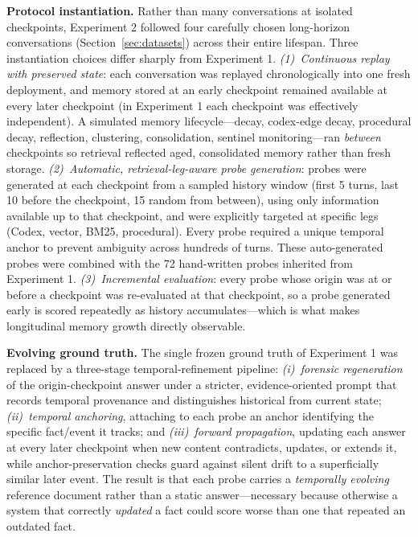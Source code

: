 \documentclass[10pt]{article}
\begin{document}
\textbf{Protocol instantiation.} Rather than many conversations at isolated checkpoints, Experiment 2 followed four carefully chosen long-horizon conversations (Section~\ref{sec:datasets}) across their entire lifespan. Three instantiation choices differ sharply from Experiment 1. \emph{(1)~Continuous replay with preserved state}: each conversation was replayed chronologically into one fresh deployment, and memory stored at an early checkpoint remained available at every later checkpoint (in Experiment 1 each checkpoint was effectively independent). A simulated memory lifecycle---decay, codex-edge decay, procedural decay, reflection, clustering, consolidation, sentinel monitoring---ran \emph{between} checkpoints so retrieval reflected aged, consolidated memory rather than fresh storage. \emph{(2)~Automatic, retrieval-leg-aware probe generation}: probes were generated at each checkpoint from a sampled history window (first 5 turns, last 10 before the checkpoint, 15 random from between), using only information available up to that checkpoint, and were explicitly targeted at specific legs (Codex, vector, BM25, procedural). Every probe required a unique temporal anchor to prevent ambiguity across hundreds of turns. These auto-generated probes were combined with the 72 hand-written probes inherited from Experiment 1. \emph{(3)~Incremental evaluation}: every probe whose origin was at or before a checkpoint was re-evaluated at that checkpoint, so a probe generated early is scored repeatedly as history accumulates---which is what makes longitudinal memory growth directly observable.

\textbf{Evolving ground truth.} The single frozen ground truth of Experiment 1 was replaced by a three-stage temporal-refinement pipeline: \emph{(i)~forensic regeneration} of the origin-checkpoint answer under a stricter, evidence-oriented prompt that records temporal provenance and distinguishes historical from current state; \emph{(ii)~temporal anchoring}, attaching to each probe an anchor identifying the specific fact/event it tracks; and \emph{(iii)~forward propagation}, updating each answer at every later checkpoint when new content contradicts, updates, or extends it, while anchor-preservation checks guard against silent drift to a superficially similar later event. The result is that each probe carries a \emph{temporally evolving} reference document rather than a static answer---necessary because otherwise a system that correctly \emph{updated} a fact could score worse than one that repeated an outdated fact.
\end{document}
